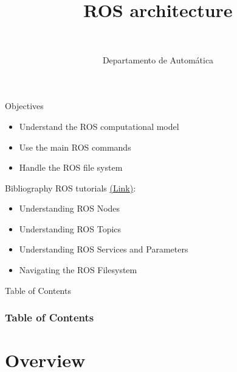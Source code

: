 \documentclass[10pt,compress]{beamer} %
\title[ROS architecture]{ROS architecture}
\author{\asignatura\\\carrera}
\institute{}
\date{Departamento de Automática}
\begin{document}
{\titlepageBlue
    \begin{frame}
        \titlepage
    \end{frame}
}

\institute{\asignatura}

\begin{frame}[plain]{}
   \begin{block}{Objectives}
       \begin{itemize}
        \item Understand the ROS computational model
        \item Use the main ROS commands
	\item Handle the ROS file system
       \end{itemize}
   \end{block}

   \begin{block}{Bibliography}
       ROS tutorials \href{http://wiki.ros.org/ROS/Tutorials}{(Link)}: 
	\begin{itemize}
	\item Understanding ROS Nodes
	\item Understanding ROS Topics
	\item Understanding ROS Services and Parameters
	\item Navigating the ROS Filesystem
	\end{itemize}
   \end{block}

\end{frame}

{
\begin{frame}[shrink]{Table of Contents}
 \frametitle{Table of Contents}
 \tableofcontents
\end{frame}
}

\section{Overview}
\end{document}
